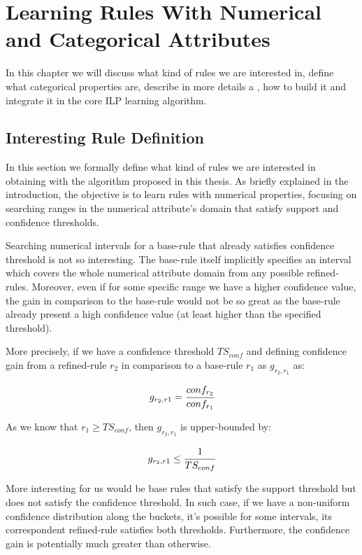 \chapter{Learning Rules With Numerical and Categorical Attributes}
\label{cl:intro}

In this chapter we will discuss what kind of rules we are interested in, define what categorical properties are,
describe in more details a \graphname, how to build it and integrate it in the core ILP learning algorithm.

\section{Interesting Rule Definition}

In this section we formally define what kind of rules we are interested in obtaining with the algorithm proposed in
this thesis. As briefly explained in the introduction, the objective is to learn rules with numerical properties,
focusing on searching ranges in the numerical attribute's domain that satisfy support and confidence thresholds.

Searching numerical intervals for a base-rule that already satisfies confidence threshold is not so interesting. The
base-rule itself implicitly specifies an interval which covers the whole numerical attribute domain from any possible
refined-rules. Moreover, even if for some specific range we have a higher confidence value, the gain in comparison to
the base-rule would not be so great as the base-rule already present a high confidence value (at least higher than the
specified threshold).

More precisely, if we have a confidence threshold $TS_{conf}$ and defining confidence gain from a refined-rule
$r_2$ in comparison to a base-rule $r_1$ as $g_{r_2,r_1}$ as:

\begin{equation}
 g_{r_2,r1}=\cfrac{conf_{r_2}}{conf_{r_1}}
\end{equation}

As we know that $r_1 \geq TS_{conf}$, then $g_{r_2,r_1}$ is upper-bounded by:

\begin{equation}
 g_{r_2,r1} \leq \cfrac{1}{TS_{conf}}
\end{equation}

More interesting for us would be base rules that satisfy the support threshold but does not satisfy the confidence
threshold. In such case, if we have a non-uniform confidence distribution along the buckets, it's possible for some
intervals, its correspondent refined-rule satisfies both thresholds. Furthermore, the confidence gain is potentially
much greater than otherwise.
 
